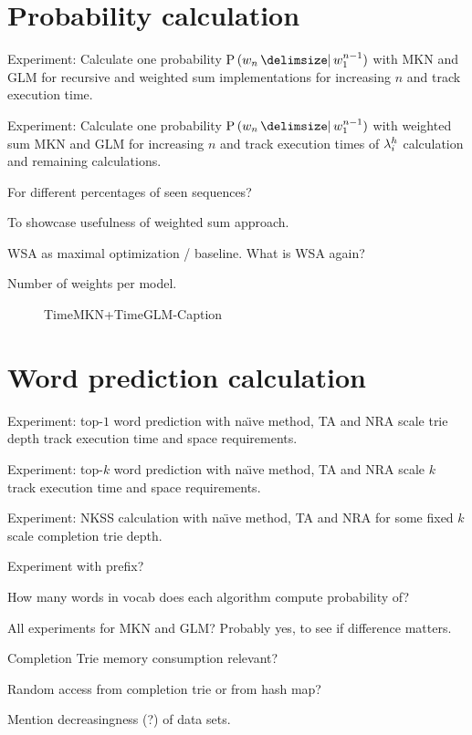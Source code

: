 \section{Probability calculation}

\begin{draft}
Experiment: Calculate one probability $\Prob{w_n}{w_1^{n-1}}$ with MKN and GLM
for recursive and weighted sum implementations for increasing $n$ and track
execution time.

Experiment: Calculate one probability $\Prob{w_n}{w_1^{n-1}}$ with weighted sum
MKN and GLM for increasing $n$ and track execution times of $\lambda^h_i$
calculation and remaining calculations.

For different percentages of seen sequences?

To showcase usefulness of weighted sum approach.

WSA as maximal optimization / baseline.
What is WSA again?

Number of weights per model.
\end{draft}

\begin{figure}
  \hspace{-5em}
  \centering
  \begin{subfigure}{.45\textwidth}
    
  \end{subfigure}
  \hspace{4em}
  \begin{subfigure}{.45\textwidth}
    
  \end{subfigure}
  \caption{TimeMKN+TimeGLM-Caption}
\end{figure}

\section{Word prediction calculation}

\begin{draft}
Experiment: top-$1$ word prediction with na\"{\i}ve method, TA and NRA scale
trie depth track execution time and space requirements.

Experiment: top-$k$ word prediction with na\"{\i}ve method, TA and NRA scale
$k$ track execution time and space requirements.

Experiment: NKSS calculation with na\"{\i}ve method, TA and NRA for some fixed
$k$ scale completion trie depth.

Experiment with prefix?

How many words in vocab does each algorithm compute probability of?

All experiments for MKN and GLM?
Probably yes, to see if difference matters.

Completion Trie memory consumption relevant?

Random access from completion trie or from hash map?

Mention decreasingness (?) of data sets.
\end{draft}

